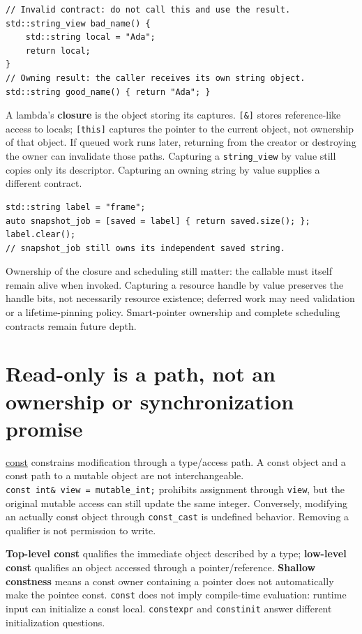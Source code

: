 \begin{verbatim}
// Invalid contract: do not call this and use the result.
std::string_view bad_name() {
    std::string local = "Ada";
    return local;
}
// Owning result: the caller receives its own string object.
std::string good_name() { return "Ada"; }
\end{verbatim}

A lambda's \textbf{closure} is the object storing its captures. \texttt{{[}\&{]}} stores reference-like access to locals; \texttt{{[}this{]}} captures the pointer to the current object, not ownership of that object. If queued work runs later, returning from the creator or destroying the owner can invalidate those paths. Capturing a \texttt{string\_view} by value still copies only its descriptor. Capturing an owning string by value supplies a different contract.

\begin{verbatim}
std::string label = "frame";
auto snapshot_job = [saved = label] { return saved.size(); };
label.clear();
// snapshot_job still owns its independent saved string.
\end{verbatim}

Ownership of the closure and scheduling still matter: the callable must itself remain alive when invoked. Capturing a resource handle by value preserves the handle bits, not necessarily resource existence; deferred work may need validation or a lifetime-pinning policy. Smart-pointer ownership and complete scheduling contracts remain future depth.

\section{Read-only is a path, not an ownership or synchronization promise}\label{01-foundations-i-ch003-read-only-is-a-path-not-an-ownership-or-synchronization-promise}

\hyperref[appendix-c25d60fed375]{const} constrains modification through a type/access path. A const object and a const path to a mutable object are not interchangeable. \texttt{const\ int\&\ view\ =\ mutable\_int;} prohibits assignment through \texttt{view}, but the original mutable access can still update the same integer. Conversely, modifying an actually const object through \texttt{const\_cast} is undefined behavior. Removing a qualifier is not permission to write.

\textbf{Top-level const} qualifies the immediate object described by a type; \textbf{low-level const} qualifies an object accessed through a pointer/reference. \textbf{Shallow constness} means a const owner containing a pointer does not automatically make the pointee const. \texttt{const} does not imply compile-time evaluation: runtime input can initialize a const local. \texttt{constexpr} and \texttt{constinit} answer different initialization questions.

